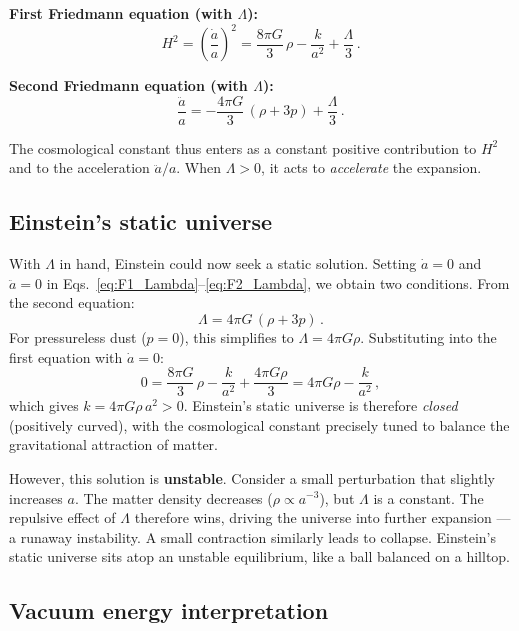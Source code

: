 \medskip
\noindent\textbf{First Friedmann equation (with $\Lambda$):}
\begin{equation}
\boxed{H^2 = \left(\frac{\dot{a}}{a}\right)^{\!2} = \frac{8\pi G}{3}\,\rho - \frac{k}{a^2} + \frac{\Lambda}{3}\,.}
\label{eq:F1_Lambda}
\end{equation}

\noindent\textbf{Second Friedmann equation (with $\Lambda$):}
\begin{equation}
\boxed{\frac{\ddot{a}}{a} = -\frac{4\pi G}{3}\,(\rho+3p) + \frac{\Lambda}{3}\,.}
\label{eq:F2_Lambda}
\end{equation}

The cosmological constant thus enters as a constant positive contribution to $H^2$ and to the acceleration $\ddot{a}/a$. When $\Lambda>0$, it acts to \emph{accelerate} the expansion.

\subsection*{Einstein's static universe}

With $\Lambda$ in hand, Einstein could now seek a static solution. Setting $\dot{a}=0$ and $\ddot{a}=0$ in Eqs.~\eqref{eq:F1_Lambda}--\eqref{eq:F2_Lambda}, we obtain two conditions. From the second equation:
\begin{equation}
    \Lambda = 4\pi G\,(\rho + 3p)\,.
\end{equation}
For pressureless dust ($p=0$), this simplifies to $\Lambda = 4\pi G\rho$. Substituting into the first equation with $\dot{a}=0$:
\begin{equation}
    0 = \frac{8\pi G}{3}\,\rho - \frac{k}{a^2} + \frac{4\pi G\rho}{3} = 4\pi G\rho - \frac{k}{a^2}\,,
\end{equation}
which gives $k = 4\pi G\rho\, a^2 > 0$. Einstein's static universe is therefore \emph{closed} (positively curved), with the cosmological constant precisely tuned to balance the gravitational attraction of matter.

However, this solution is \textbf{unstable}. Consider a small perturbation that slightly increases $a$. The matter density decreases ($\rho\propto a^{-3}$), but $\Lambda$ is a constant. The repulsive effect of $\Lambda$ therefore wins, driving the universe into further expansion --- a runaway instability. A small contraction similarly leads to collapse. Einstein's static universe sits atop an unstable equilibrium, like a ball balanced on a hilltop.

\subsection*{Vacuum energy interpretation}

